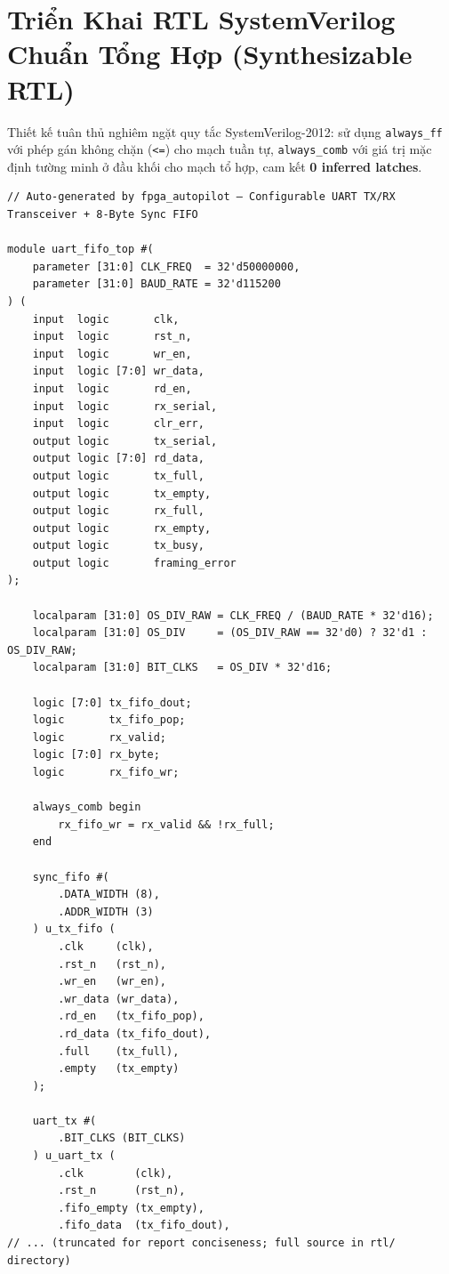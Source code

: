 \documentclass[11pt,a4paper]{article}
\begin{document}
\section{Triển Khai RTL SystemVerilog Chuẩn Tổng Hợp (Synthesizable RTL)}
Thiết kế tuân thủ nghiêm ngặt quy tắc SystemVerilog-2012: sử dụng \texttt{always\_ff} với phép gán không chặn (\texttt{<=}) cho mạch tuần tự, \texttt{always\_comb} với giá trị mặc định tường minh ở đầu khối cho mạch tổ hợp, cam kết \textbf{0 inferred latches}.

\begin{lstlisting}
// Auto-generated by fpga_autopilot — Configurable UART TX/RX Transceiver + 8-Byte Sync FIFO

module uart_fifo_top #(
    parameter [31:0] CLK_FREQ  = 32'd50000000,
    parameter [31:0] BAUD_RATE = 32'd115200
) (
    input  logic       clk,
    input  logic       rst_n,
    input  logic       wr_en,
    input  logic [7:0] wr_data,
    input  logic       rd_en,
    input  logic       rx_serial,
    input  logic       clr_err,
    output logic       tx_serial,
    output logic [7:0] rd_data,
    output logic       tx_full,
    output logic       tx_empty,
    output logic       rx_full,
    output logic       rx_empty,
    output logic       tx_busy,
    output logic       framing_error
);

    localparam [31:0] OS_DIV_RAW = CLK_FREQ / (BAUD_RATE * 32'd16);
    localparam [31:0] OS_DIV     = (OS_DIV_RAW == 32'd0) ? 32'd1 : OS_DIV_RAW;
    localparam [31:0] BIT_CLKS   = OS_DIV * 32'd16;

    logic [7:0] tx_fifo_dout;
    logic       tx_fifo_pop;
    logic       rx_valid;
    logic [7:0] rx_byte;
    logic       rx_fifo_wr;

    always_comb begin
        rx_fifo_wr = rx_valid && !rx_full;
    end

    sync_fifo #(
        .DATA_WIDTH (8),
        .ADDR_WIDTH (3)
    ) u_tx_fifo (
        .clk     (clk),
        .rst_n   (rst_n),
        .wr_en   (wr_en),
        .wr_data (wr_data),
        .rd_en   (tx_fifo_pop),
        .rd_data (tx_fifo_dout),
        .full    (tx_full),
        .empty   (tx_empty)
    );

    uart_tx #(
        .BIT_CLKS (BIT_CLKS)
    ) u_uart_tx (
        .clk        (clk),
        .rst_n      (rst_n),
        .fifo_empty (tx_empty),
        .fifo_data  (tx_fifo_dout),
// ... (truncated for report conciseness; full source in rtl/ directory)
\end{lstlisting}
\end{document}
